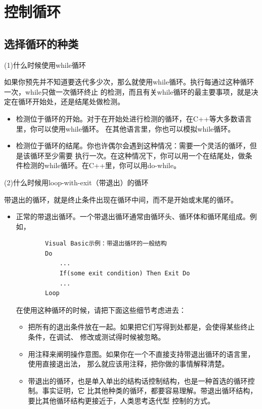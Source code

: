 \documentclass{article}
\begin{document}
\section{控制循环}
\subsection{选择循环的种类}
\par
(1)什么时候使用while循环
\par
如果你预先并不知道要迭代多少次，那么就使用while循环。执行每通过这种循环一次，while只做一次循环终止
的检测，而且有关while循环的最主要事项，就是决定在循环开始处，还是结尾处做检测。
\begin{itemize}
    \item 检测位于循环的开始。对于在开始处进行检测的循环，在C++等大多数语言里，你可以使用while循环。
    在其他语言里，你也可以模拟while循环。
    \item 检测位于循环的结尾。你也许偶尔会遇到这种情况：需要一个灵活的循环，但是该循环至少需要
    执行一次。在这种情况下，你可以用一个在结尾处，做条件检测的while循环。在C++里，你可以用do-while。
\end{itemize}

\par
(2)什么时候用loop-with-exit（带退出）的循环
\par
带退出的循环，就是终止条件出现在循环中间，而不是开始或末尾的循环。
\begin{itemize}
    \item 正常的带退出循环。一个带退出循环通常由循环头、循环体和循环尾组成。例如，
    \begin{lstlisting}
        Visual Basic示例：带退出循环的一般结构
        Do
            ...
            If(some exit condition) Then Exit Do
            ...
        Loop
    \end{lstlisting}
    在使用这种循环的时候，请把下面这些细节考虑进去：
    \begin{itemize}
        \item 把所有的退出条件放在一起。如果把它们写得到处都是，会使得某些终止条件，在调试、
        修改或测试得时候被忽略。
        \item 用注释来阐明操作意图。如果你在一个不直接支持带退出循环的语言里，使用直接退出法，
        那么就应该用注释，把你做的事情解释清楚。
        \item 带退出的循环，也是单入单出的结构话控制结构，也是一种首选的循环控制。事实证明，它
        比其他种类的循环，都要容易理解。带退出循环结构，要比其他循环结构更接近于，人类思考迭代型
        控制的方式。
    \end{itemize}
\end{itemize}
\end{document}
